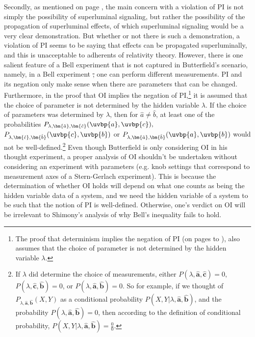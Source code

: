 \documentclass[12pt]{report}
\providecommand{\DIFdel}[1]{{\protect\color{red}\sout{#1}}}                      %
\providecommand{\DIFdelbegin}{} %
\providecommand{\DIFdelend}{} %
\begin{document}
{Secondly, as mentioned on page \pageref{lambdaknowledge}, the main concern with a violation of PI is not simply the possibility of superluminal signaling, but rather the possibility of the propagation of superluminal effects, of which superluminal signaling would be a very clear demonstration. But whether or not there is such a demonstration, a violation of PI seems to be saying that effects can be propagated superluminally, and this is unacceptable to adherents of relativity theory.} However, there is one salient feature of a Bell experiment that is not captured in Butterfield's scenario, namely, in a Bell experiment  \DIFdelbegin \DIFdel{, }\DIFdelend one can perform different measurements.  PI and its negation only make sense when there are parameters that can be changed. Furthermore, in the proof that OI implies the negation of PI,\footnote{The proof  that determinism implies the negation of PI (on pages \pageref{bellinequality2} to \pageref{PIdeterminism}), also assumes that the choice of parameter is not determined by the hidden variable $\lambda$.} it is assumed that the choice of parameter is not determined by the hidden variable $\lambda$. If the choice of parameters was determined by $\lambda$, then for $\hat{a}\neq\hat{b}$, at least one of the probabilities $P_{\lambda,\bm{\hat{a}},\bm{\hat{c}}}(\uvbp{a},\uvbp{c}),$ $P_{\lambda,\bm{\hat{c}},\bm{\hat{b}}}(\uvbp{c},\uvbp{b})$ or $P_{\lambda,\bm{\hat{a}},\bm{\hat{b}}}(\uvbp{a},\uvbp{b})$ would not be well-defined.\footnote{If $\lambda$ \label{lambdadetermineprob} did determine the choice of measurements, either $P(\lambda,\bm{\hat{a}},\bm{\hat{c}})=0$, $P(\lambda,\bm{\hat{c}},\bm{\hat{b}})=0$, or $P(\lambda,\bm{\hat{a}},\bm{\hat{b}})=0$. So for example, if we thought of $P_{\lambda,\bm{\hat{a}},\bm{\hat{b}}}(X,Y)$ as a conditional probability $P(X,Y|\lambda,\bm{\hat{a}},\bm{\hat{b}})$, and the probability $P(\lambda,\bm{\hat{a}},\bm{\hat{b}})=0$, then according to the definition of conditional probability,  $P(X,Y|\lambda,\bm{\hat{a}},\bm{\hat{b}})=\frac{0}{0}.$} Even though Butterfield is only considering OI in his thought experiment, a proper analysis of OI shouldn't be undertaken without considering an experiment with parameters (e.g. knob settings that correspond to measurement axes of a Stern-Gerlach experiment). This is because the determination of whether OI holds will depend on what one counts as being the hidden variable data of a system, and we need the hidden variable of a system to be such that the notion of PI is well-defined. Otherwise, one's verdict on OI will be irrelevant to Shimony's analysis of why Bell's inequality fails to hold. 
\end{document}
